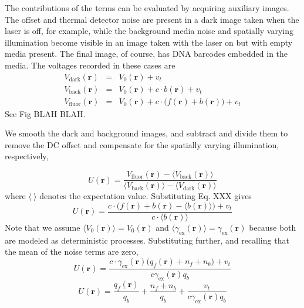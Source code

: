 The contributions of the terms can be evaluated by acquiring auxiliary images. The offset and thermal detector noise are present in a dark image taken when the laser is off, for example, while the background media noise and spatially varying illumination become visible in an image taken with the laser on but with empty media present. The final image, of course, has DNA barcodes embedded in the media. The voltages recorded in these cases are
\begin{eqnarray}
V_{\text{dark}}(\mathbf{r})&=&V_0(\mathbf{r})+v_t\\
V_{\text{back}}(\mathbf{r})&=&V_0(\mathbf{r})+c \cdot  b(\mathbf{r})  +v_t\\
V_{\text{fluor}}(\mathbf{r})&=&V_0(\mathbf{r})+c \cdot \big( f(\mathbf{r}) + b(\mathbf{r})\big)  +v_t
\end{eqnarray}
See Fig BLAH BLAH. 

We smooth the dark and background images, and subtract and divide them to remove the DC offset and compensate for the spatially varying illumination, respectively,

\begin{equation}
U(\mathbf{r})= \frac{ V_{\text{fluor}}(\mathbf{r}) - \langle V_{\text{back}}(\mathbf{r}) \rangle }{ \langle V_{\text{back}}(\mathbf{r}) \rangle - \langle V_{\text{dark}}(\mathbf{r}) \rangle}
\end{equation}
where $\langle~\rangle$ denotes the expectation value. 
Substituting Eq. XXX gives
\begin{equation}
U(\mathbf{r})= \frac{ c \cdot \big( f(\mathbf{r})  +b(\mathbf{r}) -\langle b(\mathbf{r}) \rangle \big)+ v_t  }{   c \cdot \langle b(\mathbf{r}) \rangle }
\end{equation}
Note that we assume $\langle V_0(\mathbf{r}) \rangle = V_0(\mathbf{r})$ and $\langle \gamma_{\text{ex}}(\mathbf{r}) \rangle  = \gamma_{\text{ex}}(\mathbf{r})$ because both are modeled as deterministic processes. Substituting further, and recalling that the mean of the noise terms are zero,
\begin{equation}
U(\mathbf{r})= \frac{ c \cdot \gamma_{\text{ex}}(\mathbf{r}) \big(  q_f(\mathbf{r}) + n_f       +   n_b   \big) + v_t  }{     c \gamma_{\text{ex}}(\mathbf{r})  q_b }
\end{equation}
\begin{equation}\label{eq:realDeal}
U(\mathbf{r})= \frac{ q_f(\mathbf{r}) }{ q_b} + \frac{n_f   +   n_b } {q_b}  + \frac{ v_t }{   c \gamma_{\text{ex}}(\mathbf{r}) q_b} 
\end{equation}


